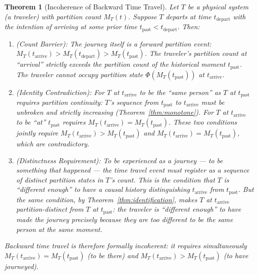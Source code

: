 \documentclass[twocolumn,10pt,a4paper]{article}
\theoremstyle{thmstyle}
\newtheorem{theorem}{Theorem}[section]
\theoremstyle{definition}
\theoremstyle{remark}
\newcommand{\PhiMap}{\varPhi}
\begin{document}
\begin{theorem}[Incoherence of Backward Time Travel]
\label{thm:time-travel}
Let $T$ be a physical system (a traveler) with partition count $M_T(t)$. Suppose $T$ departs at time $t_{\mathrm{depart}}$ with the intention of arriving at some prior time $t_{\mathrm{past}} < t_{\mathrm{depart}}$. Then:
\begin{enumerate}[leftmargin=1.5em,label=(\roman*),itemsep=0.2em]
\item \emph{(Count Barrier):} The journey itself is a forward partition event: $M_T(t_{\mathrm{arrive}}) > M_T(t_{\mathrm{depart}}) > M_T(t_{\mathrm{past}})$. The traveler's partition count at ``arrival'' strictly exceeds the partition count of the historical moment $t_{\mathrm{past}}$. The traveler cannot occupy partition state $\PhiMap(M_T(t_{\mathrm{past}}))$ at $t_{\mathrm{arrive}}$.
\item \emph{(Identity Contradiction):} For $T$ at $t_{\mathrm{arrive}}$ to be the ``same person'' as $T$ at $t_{\mathrm{past}}$ requires partition continuity: $T$'s sequence from $t_{\mathrm{past}}$ to $t_{\mathrm{arrive}}$ must be unbroken and strictly increasing (Theorem~\ref{thm:monotone}). For $T$ at $t_{\mathrm{arrive}}$ to be ``at'' $t_{\mathrm{past}}$ requires $M_T(t_{\mathrm{arrive}}) = M_T(t_{\mathrm{past}})$. These two conditions jointly require $M_T(t_{\mathrm{arrive}}) > M_T(t_{\mathrm{past}})$ and $M_T(t_{\mathrm{arrive}}) = M_T(t_{\mathrm{past}})$, which are contradictory.
\item \emph{(Distinctness Requirement):} To be experienced as a journey --- to be something that happened --- the time travel event must register as a sequence of distinct partition states in $T$'s count. This is the condition that $T$ is ``different enough'' to have a causal history distinguishing $t_{\mathrm{arrive}}$ from $t_{\mathrm{past}}$. But the same condition, by Theorem~\ref{thm:identification}, makes $T$ at $t_{\mathrm{arrive}}$ partition-distinct from $T$ at $t_{\mathrm{past}}$: the traveler is ``different enough'' to have made the journey precisely because they are too different to be the same person at the same moment.
\end{enumerate}
Backward time travel is therefore formally incoherent: it requires simultaneously $M_T(t_{\mathrm{arrive}}) = M_T(t_{\mathrm{past}})$ (to be there) and $M_T(t_{\mathrm{arrive}}) > M_T(t_{\mathrm{past}})$ (to have journeyed).
\end{theorem}
\end{document}
